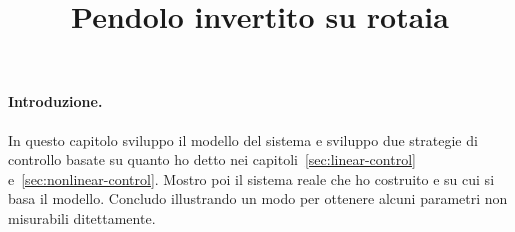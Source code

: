 \title{Pendolo invertito su rotaia}
\maketitle
\label{sec:pic}

\paragraph{Introduzione.}
In questo capitolo sviluppo il modello del sistema e sviluppo due strategie di controllo
basate su quanto ho detto nei capitoli~\ref{sec:linear-control} e~\ref{sec:nonlinear-control}. Mostro poi il sistema reale che ho costruito e su cui si basa il modello.
Concludo illustrando un modo per ottenere alcuni parametri non misurabili
ditettamente.
 






